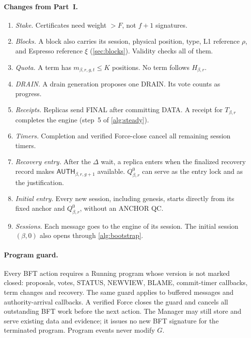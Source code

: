 \documentclass[11pt,a4paper]{article}
\newcommand{\tagg}[1]{\ensuremath{\mathsf{#1}}}
\begin{document}
\paragraph{Changes from Part~I.}
\begin{enumerate}[label=\arabic*.]
\item \emph{Stake.} Certificates need weight $>F$, not $f+1$ signatures.
\item \emph{Blocks.} A block also carries its session, physical
position, type, L1 reference $\rho$, and Espresso reference $\xi$
(\cref{sec:blocks}). Validity checks all of them.
\item \emph{Quota.} A term has $m_{\beta,r,g,t}\le K$ positions. No term
follows $H_{\beta,r}$.
\item \emph{DRAIN.} A drain generation proposes one DRAIN. Its vote
counts as progress.
\item \emph{Receipts.} Replicas send FINAL after committing DATA. A
receipt for $T_{\beta,r}$ completes the engine (step~5 of \cref{alg:steady}).
\item \emph{Timers.} Completion and verified Force-close cancel all
remaining session timers.
\item \emph{Recovery entry.} After the $\Delta$ wait, a replica enters
when the finalized recovery record makes $\tagg{AUTH}_{\beta,r,g+1}$
available. $Q_{\beta,r}^0$ can serve as the
entry lock and as the justification.
\item \emph{Initial entry.} Every new session, including genesis, starts
directly from its fixed anchor and $Q^0_{\beta,r}$, without an ANCHOR QC.
\item \emph{Sessions.} Each message goes to the engine of its session.
The initial session $(\beta,0)$ also opens through \cref{alg:bootstrap}.
\end{enumerate}

\paragraph{Program guard.}
Every BFT action requires a Running program whose version is not marked
closed: proposals, votes, STATUS, NEWVIEW, BLAME, commit-timer callbacks,
term changes and recovery. The same guard applies to buffered messages
and authority-arrival callbacks. A verified Force closes the guard and
cancels all outstanding BFT work before the next action. The Manager may
still store and serve existing data and evidence; it issues no new BFT
signature for the terminated program. Program events never modify $G$.
\end{document}
